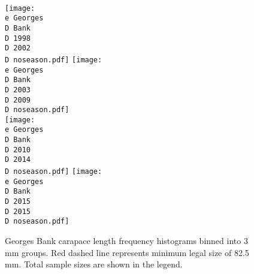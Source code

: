 \documentclass[11pt]{article}
\newcommand{\D}{.}
\newcommand{\e}{/backup/bio_data/bio.lobster/figures/} %
\begin{document}
\begin{figure}
\centering
	\\
   				\texttt{[image: \\e Georges\\D Bank\\D 1998\\D 2002\\D noseason.pdf]}
   				\texttt{[image: \\e Georges\\D Bank\\D 2003\\D 2009\\D noseason.pdf]}\\
   				\texttt{[image: \\e Georges\\D Bank\\D 2010\\D 2014\\D noseason.pdf]}
   				\texttt{[image: \\e Georges\\D Bank\\D 2015\\D 2015\\D noseason.pdf]}\\
    \caption{Georges Bank carapace length frequency histograms binned into 3 mm groups. Red dashed line represents minimum legal size of 82.5 mm. Total sample sizes are shown in the legend.}
\end{figure}
\end{document}
